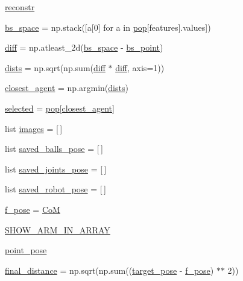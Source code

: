 \begin{DoxyCompactItemize}
\item 
\hyperlink{namespacetest__control_a362587b14304a2ba01f5dcaf55cd3108}{reconstr}
\item 
\hyperlink{namespacetest__control_a3ac06242759c7bc7c53eb4fd0911716f}{bs\+\_\+space} = np.\+stack(\mbox{[}a\mbox{[}0\mbox{]} for a in \hyperlink{namespacetest__control_a796fd07016d10db6914d0a5ccccb0732}{pop}\mbox{[}\textquotesingle{}features\textquotesingle{}\mbox{]}.values\mbox{]})
\item 
\hyperlink{namespacetest__control_ae7ba3d5b0863e8d7241a4d190204dfb3}{diff} = np.\+atleast\+\_\+2d(\hyperlink{namespacetest__control_a3ac06242759c7bc7c53eb4fd0911716f}{bs\+\_\+space} -\/ \hyperlink{namespacetest__control_a0e5fe494ac8929ac9bd895b84b5b25c8}{bs\+\_\+point})
\item 
\hyperlink{namespacetest__control_a3c7930fc7d7c4ba4202e223169518470}{dists} = np.\+sqrt(np.\+sum(\hyperlink{namespacetest__control_ae7ba3d5b0863e8d7241a4d190204dfb3}{diff} $\ast$ \hyperlink{namespacetest__control_ae7ba3d5b0863e8d7241a4d190204dfb3}{diff}, axis=1))
\item 
\hyperlink{namespacetest__control_a29317a85baaaf8e8367cc8f7fc680056}{closest\+\_\+agent} = np.\+argmin(\hyperlink{namespacetest__control_a3c7930fc7d7c4ba4202e223169518470}{dists})
\item 
\hyperlink{namespacetest__control_ad90c367e13c5e1918cc5f9e7284f32fc}{selected} = \hyperlink{namespacetest__control_a796fd07016d10db6914d0a5ccccb0732}{pop}\mbox{[}\hyperlink{namespacetest__control_a29317a85baaaf8e8367cc8f7fc680056}{closest\+\_\+agent}\mbox{]}
\item 
list \hyperlink{namespacetest__control_a459ed214c974c2c8877f3c4e4bf4e49d}{images} = \mbox{[}$\,$\mbox{]}
\item 
list \hyperlink{namespacetest__control_ae4a1dc5d454ea3ba8fca7087dc935102}{saved\+\_\+balls\+\_\+pose} = \mbox{[}$\,$\mbox{]}
\item 
list \hyperlink{namespacetest__control_af91b5208bf862f52fa346e064e8bff3d}{saved\+\_\+joints\+\_\+pose} = \mbox{[}$\,$\mbox{]}
\item 
list \hyperlink{namespacetest__control_a0dd291c941a2e023ad7a11a1be4527ad}{saved\+\_\+robot\+\_\+pose} = \mbox{[}$\,$\mbox{]}
\item 
\hyperlink{namespacetest__control_aad180e26c96bea69ed692e273ad9e6d6}{f\+\_\+pose} = \hyperlink{namespacetest__control_adade4d639cc4b59b066d579a6c1c3ee1}{CoM}
\item 
\hyperlink{namespacetest__control_a53dd4677c9659d292016e7e010417a2f}{S\+H\+O\+W\+\_\+\+A\+R\+M\+\_\+\+I\+N\+\_\+\+A\+R\+R\+AY}
\item 
\hyperlink{namespacetest__control_a2f3c84b9e8a2baaf30017976ca5c2edf}{point\+\_\+pose}
\item 
\hyperlink{namespacetest__control_a3d0d280421fdf63f3fae4fbfd5c37a8b}{final\+\_\+distance} = np.\+sqrt(np.\+sum((\hyperlink{namespacetest__control_acab1d8f94fdfa116b9180b0d82693741}{target\+\_\+pose} -\/ \hyperlink{namespacetest__control_aad180e26c96bea69ed692e273ad9e6d6}{f\+\_\+pose}) $\ast$$\ast$ 2))
\end{DoxyCompactItemize}


